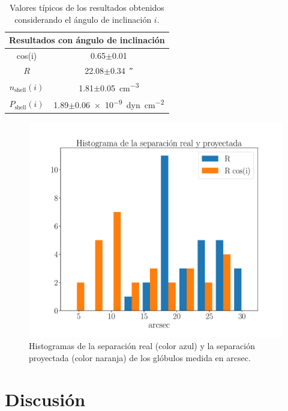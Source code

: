 \documentclass{book}
\begin{document}
\begin{table}[htb]
    \centering
    \begin{tabular}{c c}
        \toprule
        \multicolumn{2}{c}{Resultados con ángulo de inclinación} \\ \midrule
         cos(i) & 0.65$\pm$0.01 \\
         $R$ & 22.08$\pm$\SI{0.34}{\arcsecond}\\
         $n_\mathrm{shell}(i)$ & 1.81$\pm$\SI{0.05}{cm^{-3}}\\
         $P_\mathrm{shell}(i)$ & 1.89$\pm$\SI{0.06e-9}{dyn.cm^{-2}} \\
         \bottomrule
    \end{tabular}
    \caption{Valores típicos de los resultados obtenidos considerando
      el ángulo de inclinación $i$.}
    \label{tab:mean_i}
\end{table}

\begin{figure}[htb]
    \centering
    \includegraphics[width=\textwidth]{ultimos/Hist_seprarcion(1).pdf}
    \caption{Histogramas de la separación real (color azul) y la
      separación proyectada (color naranja) de los glóbulos medida en
      arcsec.}
    \label{fig:hist_sep_ryp}
\end{figure}


\chapter{Discusión}\label{Chp:conclusiones}
\end{document}
